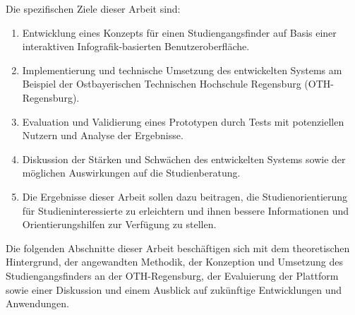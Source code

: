 Die spezifischen Ziele dieser Arbeit sind:
\begin{enumerate}
\item Entwicklung eines Konzepts für einen Studiengangsfinder auf Basis einer
interaktiven Infografik-basierten Benutzeroberfläche.
\item Implementierung und technische Umsetzung des entwickelten Systems am
Beispiel der Ostbayerischen Technischen Hochschule Regensburg (OTH-Regensburg).
\item Evaluation und Validierung eines Prototypen durch Tests mit potenziellen
Nutzern und Analyse der Ergebnisse.
\item Diskussion der Stärken und Schwächen des entwickelten Systems sowie der
möglichen Auswirkungen auf die Studienberatung.
\item Die Ergebnisse dieser Arbeit sollen dazu beitragen, die
Studienorientierung für Studieninteressierte zu erleichtern und ihnen bessere
Informationen und Orientierungshilfen zur Verfügung zu stellen.
\end{enumerate}

Die folgenden Abschnitte dieser Arbeit beschäftigen sich mit dem theoretischen
Hintergrund, der angewandten Methodik, der Konzeption und Umsetzung des
Studiengangsfinders an der OTH-Regensburg, der Evaluierung der Plattform sowie
einer Diskussion und einem Ausblick auf zukünftige Entwicklungen und
Anwendungen.
